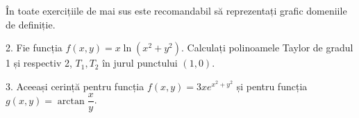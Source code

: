 În toate exercițiile de mai sus este recomandabil să reprezentați
grafic domeniile de definiție.

\vspace{1cm}

2. Fie funcția $ f(x,y) = x \ln(x^2 + y^2) $. Calculați polinoamele Taylor
de gradul 1 și respectiv 2, $ T_1, T_2 $ în jurul punctului $ (1, 0) $.

\vspace{1cm}

3. Aceeași cerință pentru funcția $ f(x, y) = 3xe^{x^2 + y^2} $ și pentru
funcția $ g(x, y) = \arctan \dfrac{x}{y} $.


